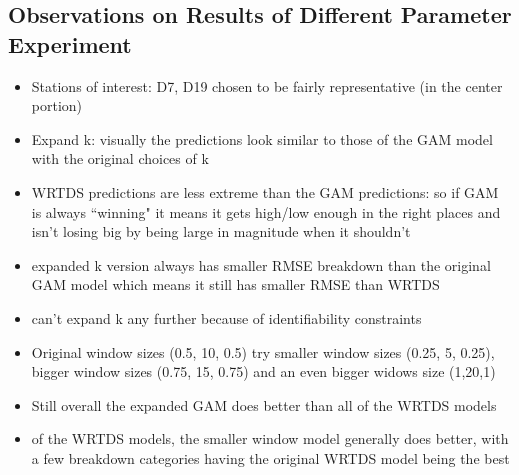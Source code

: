 \documentclass[12pt]{amsart}
\begin{document}
\subsection{Observations on Results of Different Parameter Experiment }
\begin{itemize}
\item Stations of interest: D7, D19 chosen to be fairly representative (in the center portion)
\item Expand k: visually the predictions look similar to those of the GAM model with the original choices of k
\item WRTDS predictions are less extreme than the GAM predictions: so if GAM is always ``winning" it means it gets high/low enough in the right places and isn't losing big by being large in magnitude when it shouldn't
\item expanded k version always has smaller RMSE breakdown than the original GAM model which means it still has smaller RMSE than WRTDS
\item can't expand k any further because of identifiability constraints
\item Original window sizes (0.5, 10, 0.5) try smaller window sizes (0.25, 5, 0.25), bigger window sizes (0.75, 15, 0.75) and an even bigger widows size (1,20,1)
\item Still overall the expanded GAM does better than all of the WRTDS models
\item of the WRTDS models, the smaller window model generally does better, with a few breakdown categories having the original WRTDS model being the best
\end{itemize}
\end{document}
